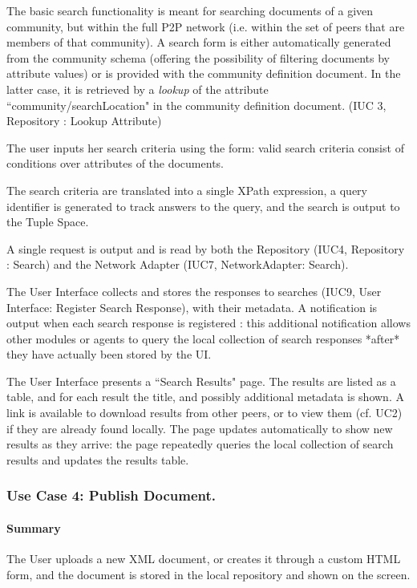 \documentclass[titlepage]{article}%
\begin{document}
The basic search functionality is meant for searching documents of a given community, but within the full P2P network (i.e. within the set of peers that are members of that community). A search form is either automatically generated from the community schema (offering the possibility of filtering documents by attribute values) or is provided with the community definition document. In the latter case, it is retrieved by a \emph{lookup} of the attribute ``community/searchLocation" in the community definition document. (IUC 3,  Repository : Lookup Attribute)

The user inputs her search criteria using the form: valid search criteria consist of conditions over attributes of the documents. 

The search criteria are translated into a single XPath expression, a query identifier is generated to track answers to the query, and the search is output to the Tuple Space. 

A single request is output and is read by both the Repository (IUC4, Repository : Search) and the Network Adapter (IUC7, NetworkAdapter: Search).

The User Interface collects and stores the responses to searches (IUC9, User Interface: Register Search Response), with their metadata. 
A notification is output when each search response is registered : this additional notification allows other modules or agents to query the local collection of search responses *after* they have actually been stored by the UI.

The User Interface presents a ``Search Results" page. The results are listed as a table, and for each result the title, and possibly additional metadata is shown. A link is available to download results from other peers, or to view them (cf. UC2) if they are already found locally.
The page updates automatically to show new results as they arrive: the page repeatedly queries the local collection of search results and updates the results table.

\subsubsection{Use Case 4: Publish Document.} 
\label{uc4}

\paragraph{Summary}
The User uploads a new XML document, or creates it through a custom HTML form, and the document is stored in the local repository and shown on the screen.
\end{document}
